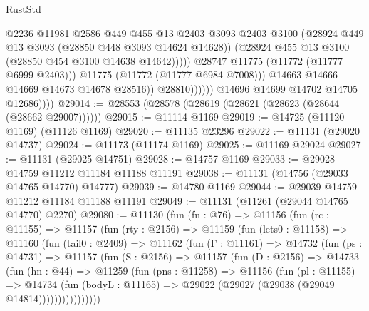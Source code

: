 \begin{lexlean}{RustStd}
\begin{coremodule}
                                      @2236
                                      @11981
                                      @2586
                                      @449
                                      @455
                                      @13
                                      @2403
                                      @3093
                                      @2403
                                      @3100
                                      (@28924 @449 @13 @3093 (@28850 @448 @3093 @14624 @14628))
                                      (@28924 @455 @13 @3100 (@28850 @454 @3100 @14638 @14642)))))
                                @28747
                                @11775
                                (@11772 (@11777 @6999 @2403)))
                              @11775
                              (@11772 (@11777 @6984 @7008)))
                            @14663
                            @14666
                            @14669
                            @14673
                            @14678
                            @28516))
                        @28810))))))
            @14696
            @14699
            @14702
            @14705
            @12686))))
@29014 := @28553 (@28578 (@28619 (@28621 (@28623 (@28644 (@28662 @29007))))))
@29015 := @11114 @1169
@29019 := @14725 (@11120 @1169) (@11126 @1169)
@29020 := @11135 @23296
@29022 := @11131 (@29020 @14737)
@29024 := @11173 (@11174 @1169)
@29025 := @11169 @29024
@29027 := @11131 (@29025 @14751)
@29028 := @14757 @1169
@29033 := @29028 @14759 @11212 @11184 @11188 @11191
@29038 := @11131 (@14756 (@29033 @14765 @14770) @14777)
@29039 := @14780 @1169
@29044 := @29039 @14759 @11212 @11184 @11188 @11191
@29049 := @11131 (@11261 (@29044 @14765 @14770) @2270)
@29080 := @11130
    (fun (fn : @76) =>
    @11156
      (fun (rc : @11155) =>
      @11157
        (fun (rty : @2156) =>
        @11159
          (fun (lets0 : @11158) =>
          @11160
            (fun (tail0 : @2409) =>
            @11162
              (fun (Γ : @11161) =>
              @14732
                (fun (ps : @14731) =>
                @11157
                  (fun (S : @2156) =>
                  @11157
                    (fun (D : @2156) =>
                    @14733
                      (fun (hn : @44) =>
                      @11259
                        (fun (pns : @11258) =>
                        @11156
                          (fun (pl : @11155) =>
                          @14734
                            (fun (bodyL : @11165) =>
                            @29022 (@29027 (@29038 (@29049 @14814))))))))))))))))

\end{coremodule}
\end{lexlean}
